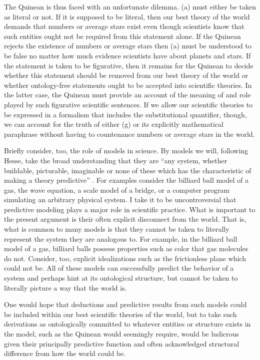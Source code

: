 \documentclass[12pt,letterpaper]{article}
\begin{document}
\begin{doublespace}
The Quinean is thus faced with an unfortunate dilemma. (a) must either
be taken as literal or not.  If it is supposed to be literal, then our
best theory of the world demands that numbers or average stars exist
even though scientists know that such entities ought not be required
from this statement alone. If the Quinean rejects the existence of
numbers or average stars then (a) must be understood to be false no
matter how much evidence scientists have about planets and stars.  If
the statement is taken to be figurative, then it remains for the
Quinean to decide whether this statement should be removed from our
best theory of the world or whether ontology-free statements ought to
be accepted into scientific theories.  In the latter case, the Quinean
must provide an account of the meaning of and role played by such
figurative scientific sentences. If we allow our scientific theories
to be expressed in a formalism that includes the substitutional
quantifier, though, we can account for the truth of either (g) or its
explicitly mathematical paraphrase without having to countenance
numbers or average stars in the world.  

Briefly consider, too, the role of models in science.  By models we
will, following Hesse, take the broad understanding that they are
``any system, whether buildable, picturable, imaginable or none of
these which has the characteristic of making a theory predictive''
\cite[p.21]{hesse}.  For examples consider the billiard ball model of
a gas, the wave equation, a scale model of a bridge, or a computer
program simulating an arbitrary physical system.  I take it to be
uncontroversial that predictive modeling plays a major role in
scientific practice.  What is important to the present argument is
their often explicit disconnect from the world.  That is, what is
common to many models is that they cannot be taken to literally
represent the system they are analogous to.  For example, in the
billiard ball model of a gas, billiard balls possess properties such
as color that gas molecules do not. Consider, too, explicit
idealizations such as the frictionless plane which could not be.  All
of these models can successfully predict the behavior of a system and
perhaps hint at its ontological structure, but cannot be taken to
literally picture a way that the world is.

One would hope that deductions and predictive results from such models
could be included within our best scientific theories of the world,
but to take such derivations as ontologically committed to whatever
entities or structure exists in the model, such as the Quinean would
seemingly require, would be ludicrous given their principally
predictive function and often acknowledged structural difference from
how the world could be.  


\end{doublespace}
\end{document}
